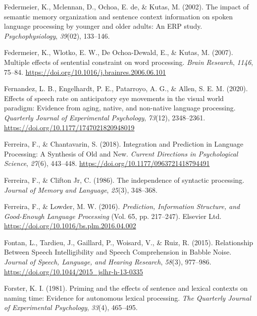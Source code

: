 \documentclass[a4paper, nobind]{templates/ociamthesis}
\newlength{\cslhangindent}
\newenvironment{CSLReferences}[2] %
 {%
  \setlength{\parindent}{0pt}
  \ifodd #1
  \let\oldpar\par
  \def\par{\hangindent=\cslhangindent\oldpar}
  \fi
  \setlength{\parskip}{1mm}
  \setlength{\baselineskip}{6mm}
 }%
 {}
\begin{document}
\begin{CSLReferences}{1}{0}
\leavevmode{}%
Federmeier, K., Mclennan, D., Ochoa, E. de, \& Kutas, M. (2002). {The impact of semantic memory organization and sentence context information on spoken language processing by younger and older adults: An ERP study}. \emph{Psychophysiology}, \emph{39}(02), 133--146.

\leavevmode{}%
Federmeier, K., Wlotko, E. W., De Ochoa-Dewald, E., \& Kutas, M. (2007). Multiple effects of sentential constraint on word processing. \emph{Brain Research}, \emph{1146}, 75--84. \url{https://doi.org/10.1016/j.brainres.2006.06.101}

\leavevmode{}%
Fernandez, L. B., Engelhardt, P. E., Patarroyo, A. G., \& Allen, S. E. M. (2020). {Effects of speech rate on anticipatory eye movements in the visual world paradigm: Evidence from aging, native, and non-native language processing}. \emph{Quarterly Journal of Experimental Psychology}, \emph{73}(12), 2348--2361. \url{https://doi.org/10.1177/1747021820948019}

\leavevmode{}%
Ferreira, F., \& Chantavarin, S. (2018). {Integration and Prediction in Language Processing: A Synthesis of Old and New}. \emph{Current Directions in Psychological Science}, \emph{27}(6), 443--448. \url{https://doi.org/10.1177/0963721418794491}

\leavevmode{}%
Ferreira, F., \& Clifton Jr, C. (1986). The independence of syntactic processing. \emph{Journal of Memory and Language}, \emph{25}(3), 348--368.

\leavevmode{}%
Ferreira, F., \& Lowder, M. W. (2016). \emph{{Prediction, Information Structure, and Good-Enough Language Processing}} (Vol. 65, pp. 217--247). Elsevier Ltd. \url{https://doi.org/10.1016/bs.plm.2016.04.002}

\leavevmode{}%
Fontan, L., Tardieu, J., Gaillard, P., Woisard, V., \& Ruiz, R. (2015). Relationship Between Speech Intelligibility and Speech Comprehension in Babble Noise. \emph{Journal of Speech, Language, and Hearing Research}, \emph{58}(3), 977--986. \url{https://doi.org/10.1044/2015_jslhr-h-13-0335}

\leavevmode{}%
Forster, K. I. (1981). Priming and the effects of sentence and lexical contexts on naming time: Evidence for autonomous lexical processing. \emph{The Quarterly Journal of Experimental Psychology}, \emph{33}(4), 465--495.


\end{CSLReferences}
\end{document}
